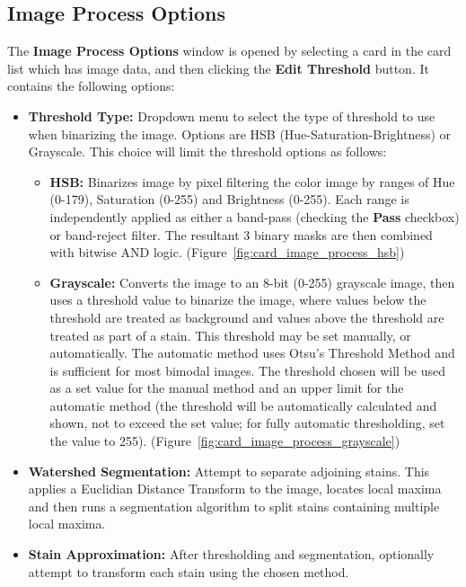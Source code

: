 \documentclass[10pt,letterpaper,titlepage]{article}
\begin{document}
    \subsection{Image Process Options}
    \label{sec:image_process}
    The \textbf{Image Process Options} window is opened by selecting a card in the card list which has image data, and then clicking the \textbf{Edit Threshold} button. It contains the following options:
    \begin{itemize}
        \item \textbf{Threshold Type:} Dropdown menu to select the type of threshold to use when binarizing the image. Options are HSB (Hue-Saturation-Brightness) or Grayscale. This choice will limit the threshold options as follows:
        \begin{itemize}
            \item \textbf{HSB:} Binarizes image by pixel filtering the color image by ranges of Hue (0-179), Saturation (0-255) and Brightness (0-255). Each range is independently applied as either a band-pass (checking the \textbf{Pass} checkbox) or band-reject filter. The resultant 3 binary masks are then combined with bitwise AND logic. (Figure~\ref{fig:card_image_process_hsb})
            \item \textbf{Grayscale:} Converts the image to an 8-bit (0-255) grayscale image, then uses a threshold value to binarize the image, where values below the threshold are treated as background and values above the threshold are treated as part of a stain. This threshold may be set manually, or automatically. The automatic method uses Otsu's Threshold Method and is sufficient for most bimodal images. The threshold chosen will be used as a set value for the manual method and an upper limit for the automatic method (the threshold will be automatically calculated and shown, not to exceed the set value; for fully automatic thresholding, set the value to 255). (Figure~\ref{fig:card_image_process_grayscale})
        \end{itemize}
        \item \textbf{Watershed Segmentation:} Attempt to separate adjoining stains. This applies a Euclidian Distance Transform to the image, locates local maxima and then runs a segmentation algorithm to split stains containing multiple local maxima.
        \item \textbf{Stain Approximation:} After thresholding and segmentation, optionally attempt to transform each stain using the chosen method.
        \begin{itemize}

\end{itemize}
\end{itemize}
\end{document}
